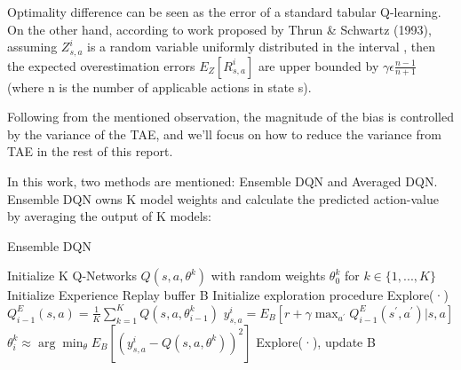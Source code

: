 Optimality difference can be seen as the error of a standard tabular Q-learning. On the other hand, according to work proposed by Thrun & Schwartz (1993), assuming \begin{math}Z^i_{s,a}\end{math} is a random variable uniformly distributed in the interval \begin{math}[-\epsilon,\epsilon]\end{math}, then the expected overestimation errors \begin{math}E_Z[R^i_{s,a}]\end{math} are upper bounded by  \begin{math}\gamma\epsilon\frac{n-1}{n+1}\end{math} (where n is the number of applicable actions in state s). \par Following from the mentioned observation, the magnitude of the bias is controlled by the variance of the TAE, and we'll focus on how to reduce the variance from TAE in the rest of this report.
\par In this work, two methods are mentioned: Ensemble DQN and Averaged DQN. Ensemble DQN owns K model weights and calculate the predicted action-value by averaging the output of K models:
\begin{algorithm}[H]
  \caption{Ensemble DQN}
  \begin{algorithmic}[1]
    \STATE Initialize K Q-Networks \begin{math} Q(s,a,\theta ^k)\end{math} with random weights \begin{math}\theta ^k_0 \end{math} for \begin{math} k\in\{1,...,K\}\end{math}
    \STATE Initialize Experience Replay buffer B
    \STATE Initialize exploration procedure Explore(·)
        \STATE\begin{math}Q^E_{i-1}(s,a)=\frac{1}{K}\sum_{k=1}^{K}Q(s,a,\theta^k_{i-1})\end{math}
        \STATE\begin{math}y^i_{s,a} = E_B[r+\gamma \max_{a^{'}} Q^E_{i-1}(s^{'},a^{'})|s,a]\end{math}
            \STATE\begin{math}\theta ^k_i\approx \arg\min_{\theta}E_B[(y^i_{s,a}-Q(s,a,\theta^k))^2]\end{math}
        \ENDFOR
        \STATE Explore(·), update B
    \ENDFOR
  \end{algorithmic}
\end{algorithm}

